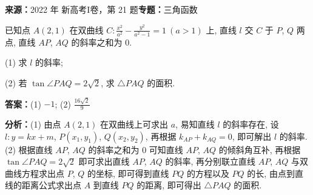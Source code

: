 \begin{question}[points=12]
\textbf{来源：}2022 年 新高考I卷，第 21 题\quad \textbf{专题：}三角函数\par
已知点 $A(2,1)$ 在双曲线 $C: \frac{x^2}{a^2} - \frac{y^2}{a^2-1} = 1\ (a>1)$ 上, 直线 $l$ 交 $C$ 于 $P$, $Q$ 两点, 直线 $AP$, $AQ$ 的斜率之和为 $0$.

(1) 求 $l$ 的斜率;

(2) 若 $\tan\angle PAQ = 2\sqrt{2}$, 求 $\triangle PAQ$ 的面积.
\begin{solution}
\textbf{答案：}(1) $-1$; (2) $\frac{16\sqrt{2}}{9}$

\textbf{分析：}(1) 由点 $A(2,1)$ 在双曲线上可求出 $a$, 易知直线 $l$ 的斜率存在, 设 $l: y = kx + m$, $P(x_1, y_1)$, $Q(x_2, y_2)$, 再根据 $k_{AP} + k_{AQ} = 0$, 即可解出 $l$ 的斜率. (2) 根据直线 $AP$, $AQ$ 的斜率之和为 $0$ 可知直线 $AP$, $AQ$ 的倾斜角互补, 再根据 $\tan\angle PAQ = 2\sqrt{2}$ 即可求出直线 $AP$, $AQ$ 的斜率, 再分别联立直线 $AP$, $AQ$ 与双曲线方程求出点 $P$, $Q$ 的坐标, 即可得到直线 $PQ$ 的方程以及 $PQ$ 的长, 由点到直线的距离公式求出点 $A$ 到直线 $PQ$ 的距离, 即可得出 $\triangle PAQ$ 的面积.


\end{solution}
\end{question}

